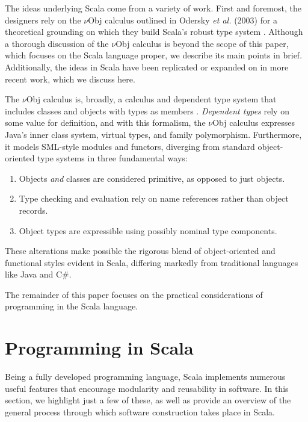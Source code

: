 \documentclass[jou,apacite]{IEEEtran}
\begin{document}
The ideas underlying Scala come from a variety of work. First and foremost, the
designers rely on the $\nu$Obj calculus outlined in Odersky \emph{et al.}
(2003) for a theoretical grounding on which they build Scala's robust type
system \cite{odersky_nominal_2003}. Although a thorough discussion of the
$\nu$Obj calculus is beyond the scope of this paper, which focuses on the Scala
language proper, we describe its main points in brief. Additionally, the ideas
in Scala have been replicated or expanded on in more recent work, which we
discuss here.

The $\nu$Obj calculus is, broadly, a calculus and dependent type system that
includes classes and objects with types as members
\cite{odersky_nominal_2003}. \emph{Dependent types} rely on some value for
definition, and with this formalism, the $\nu$Obj calculus expresses Java's
inner class system, virtual types, and family polymorphism. Furthermore, it
models SML-style modules and functors, diverging from standard object-oriented
type systems in three fundamental ways:
\begin{enumerate}
\item Objects \emph{and} classes are considered primitive, as opposed to just
  objects.
\item Type checking and evaluation rely on name references rather than object
  records.                     %
\item Object types are expressible using possibly nominal type components.
\end{enumerate}
These alterations make possible the rigorous blend of object-oriented and
functional styles evident in Scala, differing markedly from traditional
languages like Java and C\#.


The remainder of this paper focuses on the practical considerations of
programming in the Scala language.

\section{Programming in Scala}
\label{sec:programming-scala}

Being a fully developed programming language, Scala implements numerous useful
features that encourage modularity and reusability in software. In this section,
we highlight just a few of these, as well as provide an overview of the general
process through which software construction takes place in Scala.
\end{document}
